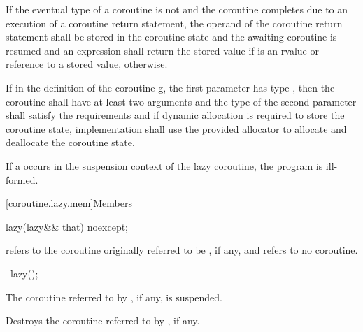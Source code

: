 {\pnum
If the eventual type of a coroutine  is not  and the coroutine completes due to an execution of a coroutine return statement, the operand of the coroutine return statement shall be stored in the coroutine state and the awaiting coroutine  is resumed and an expression  shall return the stored value if  is an rvalue or reference to a stored value, otherwise.

\pnum
If in the definition of the coroutine g, the first parameter has type , then the coroutine shall have at least two arguments and the type of the second parameter shall satisfy the  requirements and if dynamic allocation is required to store the coroutine state, implementation shall use the provided allocator to allocate and deallocate the coroutine state.

\pnum
If a  occurs
in the suspension context of the lazy coroutine,
the program is ill-formed.

[coroutine.lazy.mem]{Members}
\begin{itemdecl}
lazy(lazy&& that) noexcept;
\end{itemdecl}

\begin{itemdescr}
\pnum
\ensures
{} refers to the coroutine
originally referred to be , if any,
and  refers to no coroutine.
\end{itemdescr}

\begin{itemdecl}
~lazy();
\end{itemdecl}

\begin{itemdescr}
\expects
The coroutine referred to by , if any, is suspended.

\effects
Destroys the coroutine referred to by , if any.
\end{itemdescr}
} %
